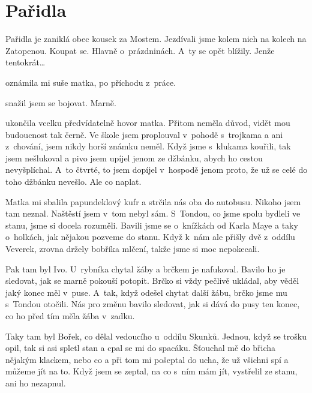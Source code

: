 
\chapter{Pařidla}

Pařidla je zaniklá obec kousek za Mostem. Jezdívali jsme kolem nich na kolech
na Zatopenou. Koupat se. Hlavně o~prázdninách. A~ty se opět blížily. Jenže
tentokrát\dots

 oznámila mi
suše matka, po příchodu z~práce.

 snažil jsem se bojovat. Marně.

 ukončila vcelku předvídatelně hovor
matka. Přitom neměla důvod, vidět mou budoucnost tak černě. Ve škole jsem
proplouval v~pohodě s~trojkama a ani z~chování, jsem nikdy horší známku neměl.
Když jsme s~klukama kouřili, tak jsem nešlukoval a pivo jsem upíjel jenom ze
džbánku, abych ho cestou nevyšplíchal. A~to čtvrté, to jsem dopíjel v~hospodě
jenom proto, že už se celé do toho džbánku nevešlo. Ale co naplat.

Matka mi sbalila papundeklový kufr a strčila nás oba do autobusu. Nikoho jsem
tam neznal. Naštěstí jsem v~tom nebyl sám. S~Tondou, co jsme spolu bydleli ve
stanu, jsme si docela rozuměli. Bavili jsme se o~knížkách od Karla Maye a taky
o~holkách, jak nějakou pozveme do stanu. Když k~nám ale přišly dvě z~oddílu
Veverek, zrovna držely bobříka mlčení, takže jsme si moc nepokecali.

Pak tam byl Ivo. U~rybníka chytal žáby a brčkem je nafukoval. Bavilo ho je
sledovat, jak se marně pokouší potopit. Brčko si vždy pečlivě ukládal, aby
věděl jaký konec měl v~puse. A~tak, když odešel chytat další žábu, brčko jsme
mu s~Tondou otočili. Nás pro změnu bavilo sledovat, jak si dává do pusy ten
konec, co ho před tím měla žába v~zadku.

Taky tam byl Bořek, co dělal vedoucího u~oddílu Skunků. Jednou, když se trošku
opil, tak si asi spletl stan a cpal se mi do spacáku. Šťouchal mě do břicha
nějakým klackem, nebo co a při tom mi pošeptal do ucha, že už všichni spí a
můžeme jít na to. Když jsem se zeptal, na co s~ním mám jít, vystřelil ze stanu,
ani ho nezapnul.

